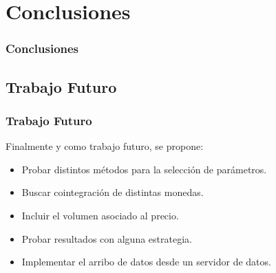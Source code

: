\documentclass{beamer}
\begin{document}
    \section{Conclusiones}
            \begin{frame}
            \frametitle{Conclusiones}
            \end{frame}
        \subsection{Trabajo Futuro}
            \begin{frame}
            \frametitle{Trabajo Futuro}
            \newpage
            Finalmente y como trabajo futuro, se propone:
            \begin{itemize}
             \item Probar distintos métodos para la selección de parámetros. 
             \item Buscar cointegración de distintas monedas. 
             \item Incluir el volumen asociado al precio.
             \item Probar resultados con alguna estrategia. 
             \item Implementar el arribo de datos desde un servidor de datos. 
            \end{itemize}

            \end{frame}
\end{document}
